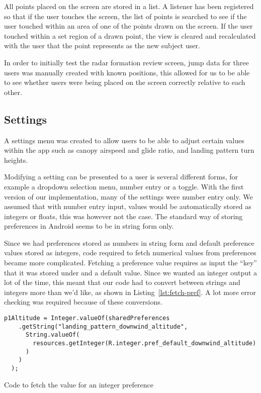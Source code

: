 All points placed on the screen are stored in a list. A listener has been registered so that if the user touches the screen, the list of points is searched to see if the user touched within an area of one of the points drawn on the screen. If the user touched within a set region of a drawn point, the view is cleared and recalculated with the user that the point represents as the new subject user.

In order to initially test the radar formation review screen, jump data for three users was manually created with known positions, this allowed for us to be able to see whether users were being placed on the screen correctly relative to each other.

\subsection{Settings}
A settings menu was created to allow users to be able to adjust certain values within the app such as canopy airspeed and glide ratio, and landing pattern turn heights.

Modifying a setting can be presented to a user is several different forms, for example a dropdown selection menu, number entry or a toggle. With the first version of our implementation, many of the settings were number entry only. We assumed that with number entry input, values would be automatically stored as integers or floats, this was however not the case. The standard way of storing preferences in Android seems to be in string form only.

Since we had preferences stored as numbers in string form and default preference values stored as integers, code required to fetch numerical values from preferences became more complicated.
Fetching a preference value requires as input the ``key'' that it was stored under and a default value. Since we wanted an integer output a lot of the time, this meant that our code had to convert between strings and integers more than we'd like, as shown in Listing~\vref{lst:fetch-pref}. A lot more error checking was required because of these conversions.

\begin{listing*}
  \centering
  \begin{verbatim}
p1Altitude = Integer.valueOf(sharedPreferences
    .getString("landing_pattern_downwind_altitude",
      String.valueOf(
        resources.getInteger(R.integer.pref_default_downwind_altitude)
      )
    )
  );
  \end{verbatim}
  \caption{Code to fetch the value for an integer preference}\label{lst:fetch-pref}
\end{listing*}

